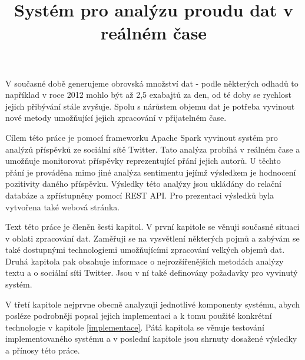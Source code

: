 \documentclass[thesis=B,czech]{FITthesis}[2012/06/26]
\title{Systém pro analýzu proudu dat v reálném čase}
\begin{document}

\lstlistoflistings

\begin{introduction}
	V současné době generujeme obrovská množství dat - podle některých odhadů to například v roce 2012 mohlo být až 2,5 exabajtů za den\cite{bbc-bigdata}, od té doby se rychlost jejich přibývání stále zvyšuje. Spolu s nárůstem objemu dat je potřeba vyvinout nové metody umožňující jejich zpracování v přijatelném čase. 
	
	Cílem této práce je pomocí frameworku Apache Spark vyvinout systém pro analýzů příspěvků ze sociální sítě Twitter. Tato analýza probíhá v reálném čase a umožňuje monitorovat příspěvky reprezentující přání jejich autorů. U těchto přání je prováděna mimo jiné analýza sentimentu jejímž výsledkem je hodnocení pozitivity daného příspěvku. Výsledky této analýzy jsou ukládány do relační databáze a zpřístupněny pomocí REST API. Pro prezentaci výsledků byla vytvořena také webová stránka. 
	
	Text této práce je členěn šesti kapitol. V první kapitole se věnuji současné situaci v oblati zpracování dat. Zaměřuji se na vysvětlení některých pojmů a zabývám se také dostupnými technologiemi umožňujícími zpracování velkých objemů dat. Druhá kapitola pak obsahuje informace o nejrozšířenějších metodách analýzy textu a o sociální síti Twitter. Jsou v ní také definovány požadavky pro vyvinutý systém. 
	
	V třetí kapitole nejprvne obecně analyzuji jednotlivé komponenty systému, abych posléze podrobněji popsal jejich implementaci a k tomu použité konkrétní technologie v kapitole \ref{implementace}. Pátá kapitola se věnuje testování implementovaného systému a v poslední kapitole jsou shrnuty dosažené výsledky a přínosy této práce. 
	
\end{introduction}

%
\end{document}
